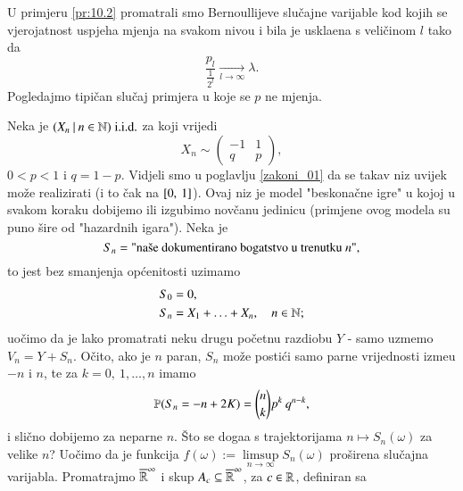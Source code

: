 U primjeru \ref{pr:10.2} promatrali smo Bernoullijeve slu\v cajne varijable kod kojih se vjerojatnost uspjeha mjenja na svakom nivou i bila je uskla\dj ena s veli\v cinom $l$ tako da
\begin{equation*}
    \frac{p_l}{\frac{1}{2^l}} \xrightarrow[l \to \infty]{} \lambda.
\end{equation*}
Pogledajmo tipi\v can slu\v caj primjera u koje se $p$ ne mjenja.

\begin{pr}
    Neka je $({X_n} \: | \: {n \in \mathbb{N}}) \; \mathrm{i.i.d.}$ za koji vrijedi
    \begin{equation*}
        X_n \sim
        \begin{pmatrix}
            -1 & 1\\
            q & p
        \end{pmatrix},
    \end{equation*}
    $0 < p < 1$ i $q = 1 - p$. Vidjeli smo u poglavlju \ref{zakoni_01} da se takav niz uvijek mo\v ze realizirati (i to \v cak na $[{0}, \:{1}]$).
    Ovaj niz je model "beskona\v cne igre" u kojoj u svakom koraku dobijemo ili izgubimo nov\v canu jedinicu (primjene ovog modela su puno \v sire od "hazardnih igara").
    Neka je
    \begin{equation*}
        S_n = \textnormal{"na\v se dokumentirano bogatstvo u trenutku $n$"},
    \end{equation*}
    to jest bez smanjenja op\' cenitosti uzimamo
    \begin{equation*}
        \begin{aligned}
            S_0 &= 0,\\
            S_n &= X_1 + \ldots + X_n, \quad n \in \mathbb{N};
        \end{aligned}
    \end{equation*}
    uo\v cimo da je lako promatrati neku drugu po\v cetnu razdiobu $Y$ - samo uzmemo $V_n = Y + S_n$.
    O\v cito, ako je $n$ paran, $S_n$ mo\v ze posti\' ci samo parne vrijednosti izme\dj u $-n$ i $n$, te za $k = 0, \: 1, \ldots, n$ imamo
    \begin{equation*}
        \mathbb{P}({S_n = -n + 2K}) = {n \choose k} p^k \: q^{n - k},
    \end{equation*}
    i sli\v cno dobijemo za neparne $n$.
    \v Sto se doga\dj a s trajektorijama $n \mapsto S_n(\omega)$ za velike $n$?
    Uo\v cimo da je funkcija $f(\omega) := \limsup\limits_{n \to \infty} S_n(\omega)$ pro\v sirena slu\v cajna varijabla.
    Promatrajmo $\overline{\mathbb{R}}^{\infty}$ i skup $A_c \subseteq \overline{\mathbb{R}}^\infty$, za $c \in \mathbb{R}$, definiran sa

\end{pr}
